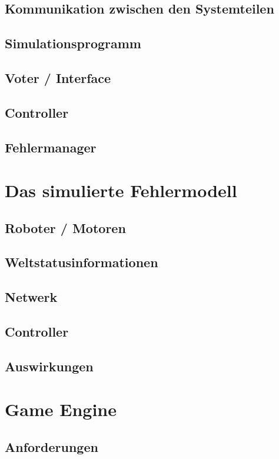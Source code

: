 \documentclass[ngerman]{scrartcl}
\begin{document}
\subsection{Kommunikation zwischen den Systemteilen}
\subsection{Simulationsprogramm}\label{graphics} %
\subsection{Voter / Interface}
\subsection{Controller}
\subsection{Fehlermanager}
\section{Das simulierte Fehlermodell}\label{fm}
\subsection{Roboter / Motoren}
\subsection{Weltstatusinformationen}
\subsection{Netwerk}
\subsection{Controller}
\subsection{Auswirkungen}
\section{Game Engine}
\subsection{Anforderungen}
\end{document}
